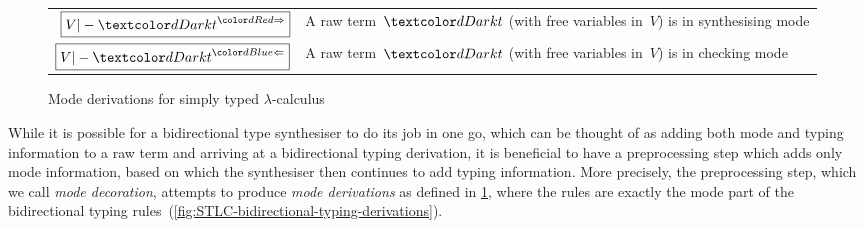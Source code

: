 
\begin{figure}
  \centering
  \small
  \bgroup
  \renewcommand{\arraystretch}{1.5}
  \begin{tabular}{ r l }
    $\boxed{V |- \isTerm{t}^{\syn}}$ & A raw term~$\isTerm{t}$ (with free variables in~$V$) is in synthesising mode \\
    $\boxed{V |- \isTerm{t}^{\chk}}$ & A raw term~$\isTerm{t}$ (with free variables in~$V$) is in checking mode
  \end{tabular}
  \egroup
  \caption{Mode derivations for simply typed $\lambda$-calculus}
  \label{fig:STLC-mode-derivations}
\end{figure}

While it is possible for a bidirectional type synthesiser to do its job in one go, which can be thought of as adding both mode and typing information to a raw term and arriving at a bidirectional typing derivation, it is beneficial to have a preprocessing step which adds only mode information, based on which the synthesiser then continues to add typing information.
More precisely, the preprocessing step, which we call \emph{mode decoration}, attempts to produce \emph{mode derivations} as defined in \cref{fig:STLC-mode-derivations}, where the rules are exactly the mode part of the bidirectional typing rules~(\cref{fig:STLC-bidirectional-typing-derivations}).

